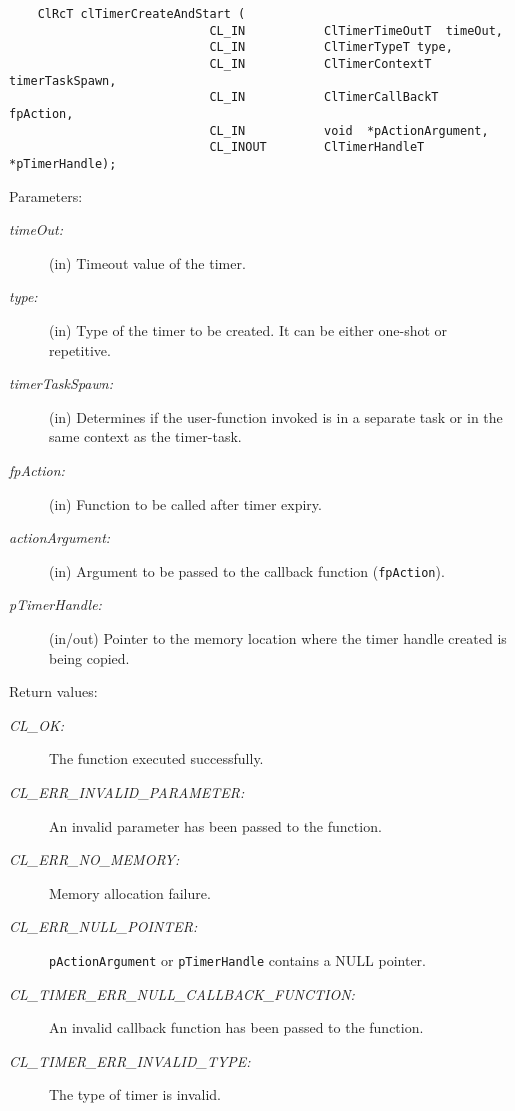 \begin{flushleft}
\begin{Desc}
\footnotesize\begin{verbatim}    ClRcT clTimerCreateAndStart (
              				CL_IN           ClTimerTimeOutT  timeOut,
              				CL_IN           ClTimerTypeT type,
              				CL_IN           ClTimerContextT timerTaskSpawn,
              				CL_IN           ClTimerCallBackT  fpAction,
              				CL_IN           void  *pActionArgument,
              				CL_INOUT        ClTimerHandleT *pTimerHandle);
\end{verbatim}
\normalsize
\end{Desc}
\begin{Desc}
\item[Parameters:]
\begin{description}
\item[{\em time\-Out:}](in) Timeout value of the timer. 
\item[{\em type:}](in) Type of the timer to be created. It can be either one-shot or repetitive.
\item[{\em timer\-Task\-Spawn:}](in) Determines if the user-function invoked is in a separate task or in the same context as the timer-task. 
\item[{\em fp\-Action:}](in) Function to be called after timer expiry. 
\item[{\em action\-Argument:}](in) Argument to be passed to the callback function ({\tt{fp\-Action}}).
\item[{\em p\-Timer\-Handle:}](in/out) Pointer to the memory location where the timer handle created is being copied.
\end{description}
\end{Desc}
\begin{Desc}
\item[Return values:]
\begin{description}
\item[{\em CL\_\-OK:}]The function executed successfully. 
\item[{\em CL\_\-ERR\_\-INVALID\_\-PARAMETER:}]An invalid parameter has been passed to the function. 
\item[{\em CL\_\-ERR\_\-NO\_\-MEMORY:}]Memory allocation failure. 
\item[{\em CL\_\-ERR\_\-NULL\_\-POINTER:}]{\tt{pActionArgument}} or {\tt{pTimerHandle}} contains a NULL pointer. 
\item[{\em CL\_\-TIMER\_\-ERR\_\-NULL\_\-CALLBACK\_\-FUNCTION:}]An invalid callback function has been passed to the function. 
\item[{\em CL\_\-TIMER\_\-ERR\_\-INVALID\_\-TYPE:}]The type of timer is invalid.\end{description}

\end{Desc}
\end{flushleft}
